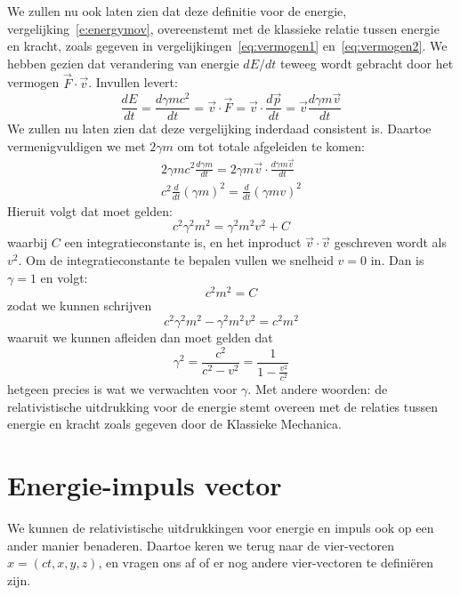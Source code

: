 We zullen nu ook laten zien dat deze definitie voor de energie,
vergelijking~\ref{e:energymov}, overeenstemt met de klassieke relatie
tussen energie en kracht, zoals gegeven in
vergelijkingen~\ref{eq:vermogen1} en~\ref{eq:vermogen2}. We hebben gezien dat verandering van energie
$dE/dt$ teweeg wordt gebracht door het vermogen $\vec{F}\cdot \vec{v}$. Invullen levert:
\begin{equation}
\frac{dE}{dt} = \frac{d\gamma m c^2 }{dt} = \vec{v}\cdot \vec{F} = \vec{v} \cdot \frac{d\vec{p}}{dt}  = \vec{v}\frac{d\gamma m\vec{v}}{dt}
\end{equation}
We zullen nu laten zien dat deze vergelijking inderdaad consistent is. Daartoe vermenigvuldigen we met $2\gamma m$ om tot totale afgeleiden te komen:
\begin{eqnarray}
2\gamma m c^2 \frac{d\gamma m}{dt} = 2\gamma m \vec{v} \cdot \frac{d\gamma m \vec{v}}{dt} \\
c^2 \frac{d}{dt} \left( \gamma m\right)^2 = \frac{d}{dt}\left( \gamma m v\right)^2
\end{eqnarray}
Hieruit volgt dat moet gelden:
\[
c^2 \gamma^2 m^2 = \gamma^2 m^2 v^2 +C
\]
waarbij $C$ een integratieconstante is, en het inproduct $\vec{v}\cdot \vec{v}$ geschreven wordt als $v^2$. Om de integratieconstante te bepalen vullen we snelheid $v=0$ in. Dan is $\gamma=1$ en volgt:
\[
c^2 m^2 = C
\]
zodat we kunnen schrijven
\[
c^2\gamma^2 m^2 - \gamma^2 m^2 v^2 = c^2 m^2
\]
waaruit we kunnen afleiden dan moet gelden dat 
\[
\gamma^2 = \frac{c^2}{c^2-v^2} = \frac{1}{1-\frac{v^2}{c^2}}
\]
hetgeen precies is wat we verwachten voor $\gamma$. Met andere woorden: de relativistische 
uitdrukking voor de energie stemt overeen met de relaties tussen energie en kracht zoals gegeven door de Klassieke Mechanica.




\section{Energie-impuls vector}
We kunnen de relativistische uitdrukkingen voor energie en impuls ook
op een ander manier benaderen. Daartoe keren we terug naar de
vier-vectoren $x=(ct,x,y,z)$, en vragen ons af of er nog andere
vier-vectoren te defini\"eren zijn.

